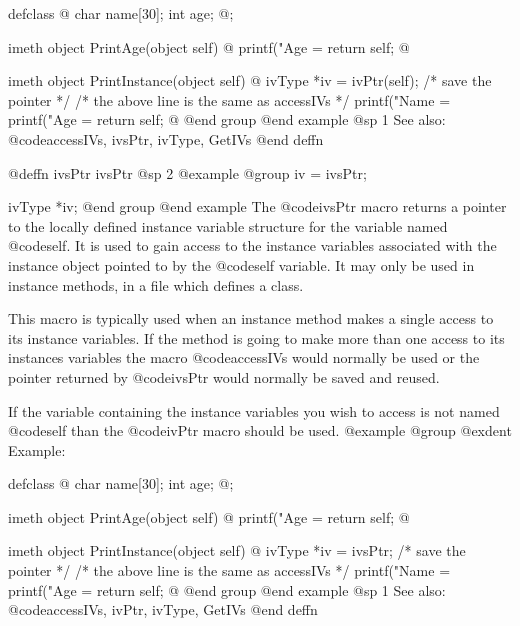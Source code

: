 {{{{defclass  @{
    char    name[30];
    int     age;
@};

imeth object  PrintAge(object self)
@{
    printf("Age = %
    return self;
@}

imeth object  PrintInstance(object self)
@{
    ivType  *iv = ivPtr(self);      /*  save the pointer */
/* the above line is the same as accessIVs  */
    printf("Name = %
    printf("Age = %
    return self;
@}
@end group
@end example
@sp 1
See also:  @code{accessIVs, ivsPtr, ivType, GetIVs}
@end deffn



















@deffn {ivsPtr} ivsPtr
@sp 2
@example
@group
iv = ivsPtr;

ivType  *iv;
@end group
@end example
The @code{ivsPtr} macro returns a pointer to the locally defined
instance variable structure for the variable named @code{self}.  It is
used to gain access to the instance variables associated with the
instance object pointed to by the @code{self} variable.  It may only be
used in instance methods, in a file which defines a class.

This macro is typically used when an instance method makes a single
access to its instance variables.  If the method is going to make more
than one access to its instances variables the macro @code{accessIVs}
would normally be used or the pointer returned by @code{ivsPtr}
would normally be saved and reused.

If the variable containing the instance variables you wish to access
is not named @code{self} than the @code{ivPtr} macro should be used.
@example
@group
@exdent Example:

defclass  @{
    char    name[30];
    int     age;
@};

imeth object  PrintAge(object self)
@{
    printf("Age = %
    return self;
@}

imeth object  PrintInstance(object self)
@{
    ivType  *iv = ivsPtr;   /*  save the pointer */
/* the above line is the same as accessIVs  */
    printf("Name = %
    printf("Age = %
    return self;
@}
@end group
@end example
@sp 1
See also:  @code{accessIVs, ivPtr, ivType, GetIVs}
@end deffn












}}}}
